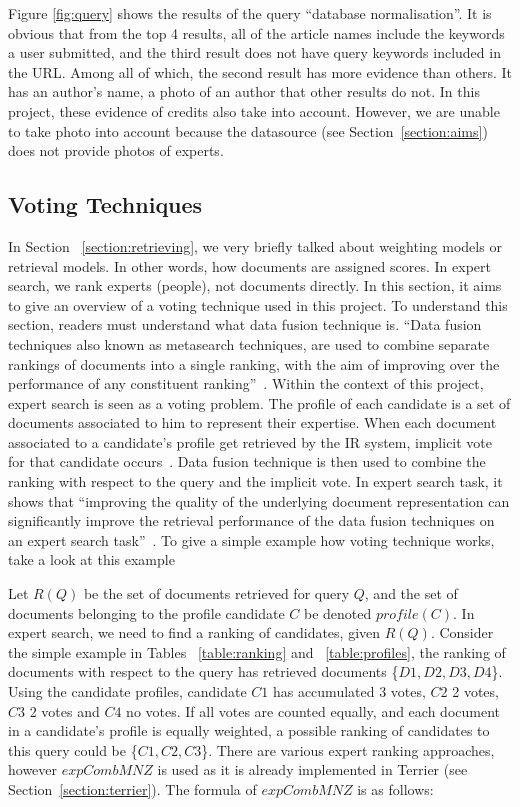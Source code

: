 Figure \ref{fig:query} shows the results of the query ``database normalisation''. It is obvious that from the top 4 results, all of the article names
include the keywords a user submitted, and the third result does not have query keywords included in the URL. Among all of which, the second result has more 
evidence than others. It has an author's name, a photo of an author that other results do not. In this project, these evidence of credits also take into account.
However, we are unable to take photo into account because the datasource (see Section~\ref{section:aims})
does not provide photos of experts.

\subsection{Voting Techniques}\label{section:voting}
In Section ~\ref{section:retrieving}, we very briefly talked about weighting models or retrieval models. In other words, how documents are assigned scores. 
In expert search, we rank experts (people), not documents directly. In this section,
it aims to give an overview of a voting technique used in this project. To understand this section, readers must understand what data fusion technique is. 
``Data fusion techniques also known as metasearch techniques, are used to combine separate rankings of documents into a single ranking,
with the aim of improving over the performance of any constituent ranking''~\cite[P. 388]{expertsearch}. Within the context of this project, 
expert search is seen as a voting problem. The profile of each candidate is a set of documents associated to him to represent their expertise.
When each document associated to a candidate's profile get retrieved by the IR system, implicit vote for that candidate occurs~\cite[P. 389]{expertsearch}.
Data fusion technique is then used to combine the ranking with respect to the query and the implicit vote. In expert search task, it shows that 
``improving the quality of the underlying document representation can significantly improve the retrieval performance of the data fusion techniques 
on an expert search task''~\cite[P. 387]{expertsearch}. To give a simple example how voting technique works, take a look at this example

Let $R(Q)$ be the set of documents retrieved for query $Q$, and the set of documents belonging to the profile candidate $C$ be denoted $profile(C)$. In expert
search, we need to find a ranking of candidates, given $R(Q)$. Consider the simple example in Tables ~\ref{table:ranking} and ~\ref{table:profiles},
the ranking of documents with respect to the query has retrieved documents \{$D1, D2, D3, D4$\}. Using the candidate profiles, candidate $C1$ has accumulated
3 votes, $C2$ 2 votes, $C3$ 2 votes and $C4$ no votes. If all votes are counted equally, and each document in a candidate's profile is equally weighted, a possible
ranking of candidates to this query could be \{$C1, C2, C3$\}. 
There are various expert ranking approaches, however $expCombMNZ$ is used as it is already implemented in Terrier (see Section~\ref{section:terrier}).
The formula of $expCombMNZ$ is as follows:

